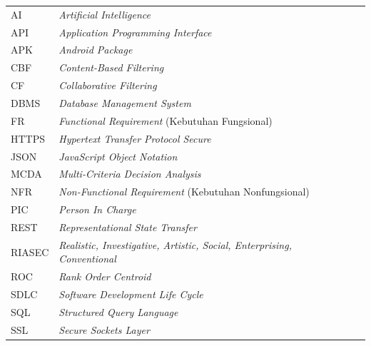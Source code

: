 \begin{longtable}{@{} l >{\raggedright\arraybackslash}p{9cm} l @{}}
AI      & \textit{Artificial Intelligence}                              & \pageref{chap:perancangan}       \\
API     & \textit{Application Programming Interface}                    & \pageref{chap:perancangan}       \\
APK     & \textit{Android Package}                                      & \pageref{chap:perancangan}       \\
CBF     & \textit{Content-Based Filtering}                              & \pageref{chap:analisis-masalah}  \\
CF      & \textit{Collaborative Filtering}                              & \pageref{chap:analisis-masalah}  \\
DBMS    & \textit{Database Management System}                           & \pageref{chap:implementasi}      \\
FR      & \textit{Functional Requirement} (Kebutuhan Fungsional)        & \pageref{chap:studi-literatur}   \\
HTTPS   & \textit{Hypertext Transfer Protocol Secure}                   & \pageref{chap:perancangan}       \\
JSON    & \textit{JavaScript Object Notation}                           & \pageref{chap:perancangan}       \\
MCDA    & \textit{Multi-Criteria Decision Analysis}                     & \pageref{chap:perancangan}       \\
NFR     & \textit{Non-Functional Requirement} (Kebutuhan Nonfungsional) & \pageref{chap:analisis-masalah}  \\
PIC     & \textit{Person In Charge}                                     & \pageref{chap:perancangan}       \\
REST    & \textit{Representational State Transfer}                      & \pageref{chap:perancangan}       \\
RIASEC  & \textit{Realistic, Investigative, Artistic, Social, Enterprising, Conventional} & \pageref{chap:studi-literatur} \\
ROC     & \textit{Rank Order Centroid}                                  & \pageref{chap:studi-literatur}   \\
SDLC    & \textit{Software Development Life Cycle}                      & \pageref{chap:pendahuluan}       \\
SQL     & \textit{Structured Query Language}                            & \pageref{chap:lampiran-b}        \\
SSL     & \textit{Secure Sockets Layer}                                 & \pageref{chap:perancangan}       \\

\end{longtable}
